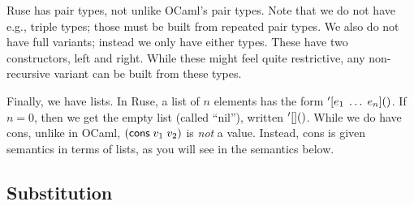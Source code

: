 \documentclass{homework}
\begin{document}
Ruse has pair types, not unlike OCaml's pair types.
Note that we do not have e.g., triple types; those must be built from repeated pair types.
We also do not have full variants; instead we only have \textsf{either} types.
These have two constructors, \textsf{left} and \textsf{right}.
While these might feel quite restrictive, any non-recursive variant can be built from these types.

Finally, we have lists.
In Ruse, a list of $n$ elements has the form $\lst{e_1\; \ldots\; e_n}$.
If $n = 0$, then we get the empty list (called ``nil''), written $\lst{}$.
While we do have \textsf{cons}, unlike in OCaml, $(\textsf{cons}\;v_1\;v_2)$ is \emph{not} a value.
Instead, \textsf{cons} is given semantics in terms of lists, as you will see in the semantics below.

\subsection{Substitution}
\label{sec:substitution}
\end{document}
